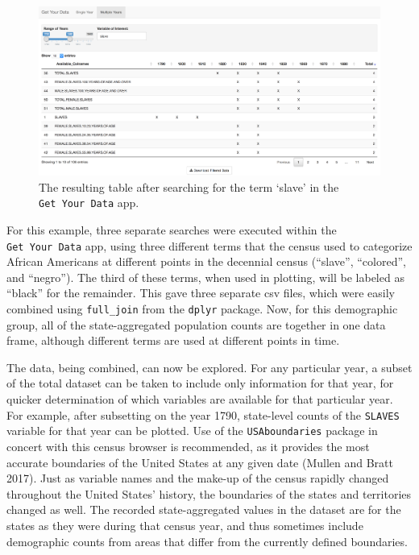 \documentclass[11pt,]{article}
\begin{document}
\begin{figure}[htbp]
\centering
\includegraphics{./figures/app-sshot-slave.png}
\caption{The resulting table after searching for the term `slave' in the
\texttt{Get\ Your\ Data} app.}
\end{figure}

For this example, three separate searches were executed within the
\texttt{Get\ Your\ Data} app, using three different terms that the
census used to categorize African Americans at different points in the
decennial census (``slave'', ``colored'', and ``negro''). The third of
these terms, when used in plotting, will be labeled as ``black'' for the
remainder. This gave three separate csv files, which were easily
combined using \texttt{full\_join} from the \texttt{dplyr} package. Now,
for this demographic group, all of the state-aggregated population
counts are together in one data frame, although different terms are used
at different points in time.

The data, being combined, can now be explored. For any particular year,
a subset of the total dataset can be taken to include only information
for that year, for quicker determination of which variables are
available for that particular year. For example, after subsetting on the
year 1790, state-level counts of the \texttt{SLAVES} variable for that
year can be plotted. Use of the \texttt{USAboundaries} package in
concert with this census browser is recommended, as it provides the most
accurate boundaries of the United States at any given date (Mullen and
Bratt 2017). Just as variable names and the make-up of the census
rapidly changed throughout the United States' history, the boundaries of
the states and territories changed as well. The recorded
state-aggregated values in the dataset are for the states as they were
during that census year, and thus sometimes include demographic counts
from areas that differ from the currently defined boundaries.
\end{document}
